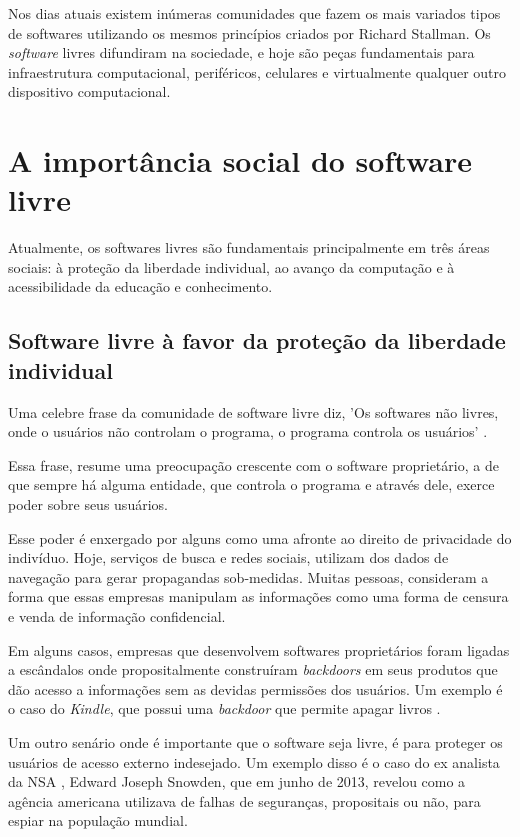 Nos dias atuais existem inúmeras comunidades que fazem os mais variados tipos de softwares utilizando os mesmos princípios criados por Richard Stallman. Os \textit{software} livres difundiram na sociedade, e hoje são peças fundamentais para infraestrutura computacional, periféricos, celulares e virtualmente qualquer outro dispositivo computacional.

\section{A importância social do software livre}
Atualmente, os softwares livres são fundamentais principalmente em três áreas sociais: à proteção da liberdade individual, ao avanço da computação e à acessibilidade da educação e conhecimento.

\subsection{Software livre à favor da proteção da liberdade individual}
Uma celebre frase da comunidade de software livre diz, 'Os softwares não livres, onde o usuários não controlam o programa, o programa controla os usuários' \cite{Williams}. 

Essa frase, resume uma preocupação crescente com o software proprietário, a de que sempre há   alguma entidade, que controla o programa e através dele, exerce poder sobre seus usuários. 

Esse poder é enxergado por alguns como uma afronte ao direito de privacidade do indivíduo. Hoje, serviços de busca e redes sociais, utilizam dos dados de navegação para gerar propagandas sob-medidas.  Muitas pessoas, consideram a forma que essas empresas manipulam as informações como uma forma de censura e venda de informação confidencial. 

Em alguns casos, empresas que desenvolvem softwares proprietários foram ligadas a escândalos onde propositalmente construíram \textit{backdoors} em seus produtos que dão acesso a informações sem as devidas permissões dos usuários. Um exemplo é o caso do \textit{ Kindle}, que possui uma \textit{backdoor} que permite apagar livros \cite{GNUOperatingSystem} .

Um outro senário onde é importante que o software seja livre, é para proteger os usuários de acesso externo indesejado. Um exemplo disso é o caso do ex analista da NSA \cite{Tate2013}, Edward Joseph Snowden, que em junho de 2013, revelou como a agência americana utilizava de falhas de seguranças, propositais ou não, para espiar na população mundial. 

